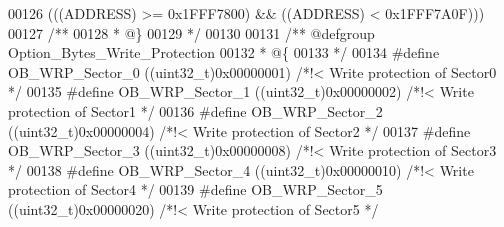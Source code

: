 \begin{DoxyCode}
00126                                    \textcolor{preprocessor}{(}\textcolor{preprocessor}{(}\textcolor{preprocessor}{(}\textcolor{preprocessor}{ADDRESS}\textcolor{preprocessor}{)} \textcolor{preprocessor}{>=} 0x1FFF7800\textcolor{preprocessor}{)} \textcolor{preprocessor}{&&} \textcolor{preprocessor}{(}\textcolor{preprocessor}{(}\textcolor{preprocessor}{ADDRESS}\textcolor{preprocessor}{)} \textcolor{preprocessor}{<} 0x1FFF7A0F\textcolor{preprocessor}{)}\textcolor{preprocessor}{)}\textcolor{preprocessor}{)}
00127 \textcolor{comment}{/**}
00128 \textcolor{comment}{  * @\}}
00129 \textcolor{comment}{  */}
00130 
00131 \textcolor{comment}{/** @defgroup Option\_Bytes\_Write\_Protection }
00132 \textcolor{comment}{  * @\{}
00133 \textcolor{comment}{  */}
00134 \textcolor{preprocessor}{#}\textcolor{preprocessor}{define} \textcolor{preprocessor}{OB\_WRP\_Sector\_0}       \textcolor{preprocessor}{(}\textcolor{preprocessor}{(}\textcolor{preprocessor}{uint32\_t}\textcolor{preprocessor}{)}0x00000001\textcolor{preprocessor}{)} \textcolor{comment}{/*!< Write protection of Sector0 */}
00135 \textcolor{preprocessor}{#}\textcolor{preprocessor}{define} \textcolor{preprocessor}{OB\_WRP\_Sector\_1}       \textcolor{preprocessor}{(}\textcolor{preprocessor}{(}\textcolor{preprocessor}{uint32\_t}\textcolor{preprocessor}{)}0x00000002\textcolor{preprocessor}{)} \textcolor{comment}{/*!< Write protection of Sector1 */}
00136 \textcolor{preprocessor}{#}\textcolor{preprocessor}{define} \textcolor{preprocessor}{OB\_WRP\_Sector\_2}       \textcolor{preprocessor}{(}\textcolor{preprocessor}{(}\textcolor{preprocessor}{uint32\_t}\textcolor{preprocessor}{)}0x00000004\textcolor{preprocessor}{)} \textcolor{comment}{/*!< Write protection of Sector2 */}
00137 \textcolor{preprocessor}{#}\textcolor{preprocessor}{define} \textcolor{preprocessor}{OB\_WRP\_Sector\_3}       \textcolor{preprocessor}{(}\textcolor{preprocessor}{(}\textcolor{preprocessor}{uint32\_t}\textcolor{preprocessor}{)}0x00000008\textcolor{preprocessor}{)} \textcolor{comment}{/*!< Write protection of Sector3 */}
00138 \textcolor{preprocessor}{#}\textcolor{preprocessor}{define} \textcolor{preprocessor}{OB\_WRP\_Sector\_4}       \textcolor{preprocessor}{(}\textcolor{preprocessor}{(}\textcolor{preprocessor}{uint32\_t}\textcolor{preprocessor}{)}0x00000010\textcolor{preprocessor}{)} \textcolor{comment}{/*!< Write protection of Sector4 */}
00139 \textcolor{preprocessor}{#}\textcolor{preprocessor}{define} \textcolor{preprocessor}{OB\_WRP\_Sector\_5}       \textcolor{preprocessor}{(}\textcolor{preprocessor}{(}\textcolor{preprocessor}{uint32\_t}\textcolor{preprocessor}{)}0x00000020\textcolor{preprocessor}{)} \textcolor{comment}{/*!< Write protection of Sector5 */}

\end{DoxyCode}
